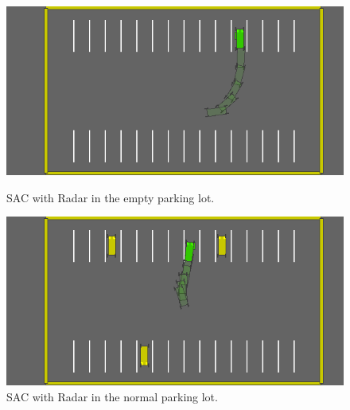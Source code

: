 \documentclass{article}
\begin{document}
\begin{figure}[h]
  \centering
  \begin{minipage}[b]{0.45\textwidth}
    \centering
    \includegraphics[width=\textwidth]{./pics/good/kine_SAC_empty.png}
    \caption*{SAC with Radar in the empty parking lot.}
  \end{minipage}
  \hfill
  \begin{minipage}[b]{0.45\textwidth}
    \centering
    \includegraphics[width=\textwidth]{./pics/good/kine_SAC_normal.png}
    \caption*{SAC with Radar in the normal parking lot.}
  \end{minipage}

  \vspace{1em}


\end{figure}
\end{document}
